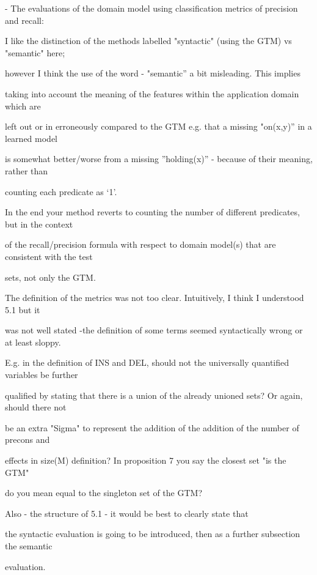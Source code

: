 \documentclass{article}
\begin{document}
\begin{mdframed}[hidealllines=true,backgroundcolor=gray!20]
  - The evaluations of the domain model using classification metrics of precision and recall:

I like the distinction of the methods labelled "syntactic" (using the GTM) vs "semantic" here;

however I think the use of the word - "semantic” a bit misleading. This implies

taking into account the meaning of the features within the application domain which are

left out or in erroneously compared to the GTM e.g. that a missing "on(x,y)” in a learned model

is somewhat better/worse from a missing ”holding(x)” - because of their meaning, rather than

counting each predicate as ‘1’.

In the end your method reverts to counting the number of different predicates, but in the context 

of the recall/precision formula with respect to domain model(s) that are consistent with the test 

sets, not only the GTM.  

  

The definition of the metrics was not too clear. Intuitively, I think I understood 5.1 but it 

was not well stated -the definition of some terms seemed syntactically wrong or at least sloppy. 

E.g. in the definition of INS and DEL, should not the universally quantified variables be further 

qualified by stating that there is a union of the already unioned sets? Or again, should there not

be an extra "Sigma" to represent the addition of the addition of the number of precons and 

effects in size(M) definition?  In proposition 7 you say the closest set "is the GTM" 

do you mean equal to the singleton set of the GTM? 

Also - the structure of 5.1 - it would be best to clearly state that

the syntactic evaluation is going to be introduced, then as a further subsection the semantic 

evaluation.
\end{mdframed}
\end{document}
